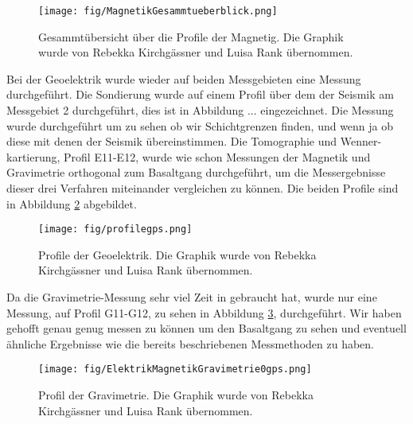 \begin{figure}
 \centering
 \texttt{[image: fig/MagnetikGesammtueberblick.png]}
 \caption[Gesammtübersicht über die Profile der Magnetig]{Gesammtübersicht über die Profile der Magnetig. Die Graphik wurde von Rebekka Kirchgässner und Luisa Rank übernommen.}
 \label{abb:Magnetik}
\end{figure}

Bei der Geoelektrik wurde wieder auf beiden Messgebieten eine Messung durchgeführt. Die Sondierung wurde auf einem Profil über dem der Seismik am Messgebiet 2 durchgeführt, dies ist in 
Abbildung ... eingezeichnet. Die Messung wurde durchgeführt um zu sehen ob wir Schichtgrenzen finden, und wenn ja ob diese mit denen der Seismik übereinstimmen.
Die Tomographie und Wenner-kartierung, Profil E11-E12, wurde wie schon Messungen der Magnetik und Gravimetrie orthogonal zum Basaltgang durchgeführt, um die Messergebnisse dieser drei Verfahren
miteinander vergleichen zu können. Die beiden Profile sind in Abbildung \ref{abb:Geoelek} abgebildet.

\begin{figure}
 \centering
 \texttt{[image: fig/profilegps.png]}
 \caption[Profile der Geoelktrik]{Profile der Geoelektrik. Die Graphik wurde von Rebekka Kirchgässner und Luisa Rank übernommen. }
 \label{abb:Geoelek}
\end{figure}

Da die Gravimetrie-Messung sehr viel Zeit in gebraucht hat, wurde nur eine Messung, auf Profil G11-G12, zu sehen in Abbildung \ref{abb:Geoelek2}, durchgeführt. Wir haben gehofft genau genug
messen zu können um den Basaltgang zu sehen und eventuell ähnliche Ergebnisse wie die bereits beschriebenen Messmethoden zu haben.

\begin{figure}
 \centering
 \texttt{[image: fig/ElektrikMagnetikGravimetrie0gps.png]}
 \caption[Profil der Gravimetrie]{Profil der Gravimetrie. Die Graphik wurde von Rebekka Kirchgässner und Luisa Rank übernommen. }
 \label{abb:Geoelek2}
\end{figure}






